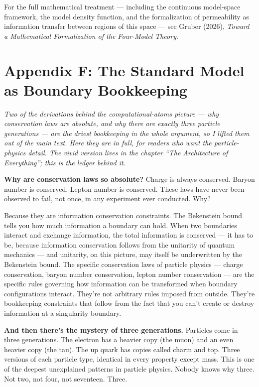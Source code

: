 \documentclass[11pt, twoside, openright]{book}
\begin{document}
For the full mathematical treatment --- including the continuous model-space framework, the model density function, and the formalization of permeability as information transfer between regions of this space --- see Gruber (2026), \textit{Toward a Mathematical Formalization of the Four-Model Theory}.


\chapter*{Appendix F: The Standard Model as Boundary Bookkeeping}

\textit{Two of the derivations behind the computational-atoms picture --- why conservation laws are absolute, and why there are exactly three particle generations --- are the driest bookkeeping in the whole argument, so I lifted them out of the main text. Here they are in full, for readers who want the particle-physics detail. The vivid version lives in the chapter ``The Architecture of Everything''; this is the ledger behind it.}

\textbf{Why are conservation laws so absolute?} Charge is always conserved. Baryon number is conserved. Lepton number is conserved. These laws have never been observed to fail, not once, in any experiment ever conducted. Why?

Because they are information conservation constraints. The Bekenstein bound tells you how much information a boundary can hold. When two boundaries interact and exchange information, the total information is conserved --- it has to be, because information conservation follows from the unitarity of quantum mechanics --- and unitarity, on this picture, may itself be underwritten by the Bekenstein bound. The specific conservation laws of particle physics --- charge conservation, baryon number conservation, lepton number conservation --- are the specific rules governing how information can be transformed when boundary configurations interact. They're not arbitrary rules imposed from outside. They're bookkeeping constraints that follow from the fact that you can't create or destroy information at a singularity boundary.

\textbf{And then there's the mystery of three generations.} Particles come in three generations. The electron has a heavier copy (the muon) and an even heavier copy (the tau). The up quark has copies called charm and top. Three versions of each particle type, identical in every property except mass. This is one of the deepest unexplained patterns in particle physics. Nobody knows why three. Not two, not four, not seventeen. Three.
\end{document}
